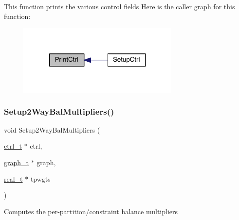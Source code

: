 This function prints the various control fields Here is the caller graph for this function\+:\nopagebreak
\begin{figure}[H]
\begin{center}
\leavevmode
\includegraphics[width=228pt]{a00254_a2c75ede1a41b19cb3705b998aba3200b_icgraph}
\end{center}
\end{figure}
\mbox{\label{a00254_ab7bde9f22de07a798b97f1f8e83768b1}} 
\subsubsection{\texorpdfstring{Setup2\+Way\+Bal\+Multipliers()}{Setup2WayBalMultipliers()}}
{\footnotesize\ttfamily void Setup2\+Way\+Bal\+Multipliers (\begin{DoxyParamCaption}\item[{\hyperlink{a00742}{ctrl\+\_\+t} $\ast$}]{ctrl,  }\item[{\hyperlink{a00734}{graph\+\_\+t} $\ast$}]{graph,  }\item[{\hyperlink{a00876_a1924a4f6907cc3833213aba1f07fcbe9}{real\+\_\+t} $\ast$}]{tpwgts }\end{DoxyParamCaption})}

Computes the per-\/partition/constraint balance multipliers \mbox{\label{a00254_a1420c4ffbe28e4c3349678037adcb918}} 
